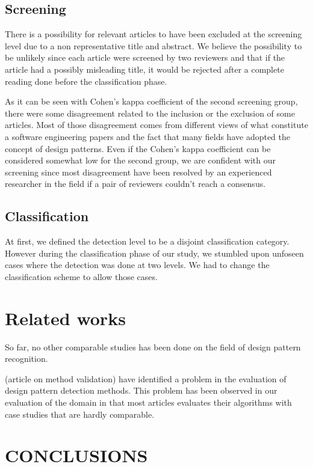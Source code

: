 \documentclass[letterpaper, 10 pt, conference]{ieeeconf}  %
\begin{document}
\subsection{Screening}

There is a possibility for relevant articles to have been excluded at the
screening level due to a non representative title and abstract.
We believe the possibility to be unlikely since each article were screened by
two reviewers and that if the article had a possibly misleading title, it would
be rejected after a complete reading done before the classification phase.

As it can be seen with Cohen's kappa coefficient of the second screening group,
there were some disagreement related to the inclusion or the exclusion of some
articles.
Most of those disagreement comes from different views of what constitute a
software engineering papers and the fact that many fields have adopted the
concept of design patterns.
Even if the Cohen's kappa coefficient can be considered somewhat low for the
second group, we are confident with our screening since most disagreement have
been resolved by an experienced researcher in the field if a pair of reviewers
couldn't reach a consensus.


\subsection{Classification}

At first, we defined the detection level to be a disjoint classification category.
However during the classification phase of our study, we stumbled upon unfoseen cases
where the detection was done at two levels. We had to change the classification
scheme to allow those cases.


\section{Related works}



So far, no other comparable studies has been done on the field of design pattern
recognition.

(article on method validation) have identified a problem in the evaluation of design
pattern detection methods. This problem has been observed in our evaluation of the
domain in that most articles evaluates their algorithms with case studies that are
hardly comparable.




\section{CONCLUSIONS}
\end{document}
